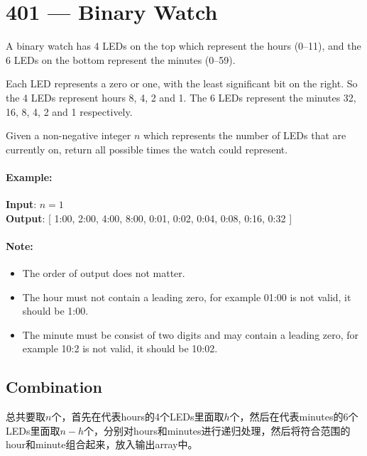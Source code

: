 \section{401 --- Binary Watch}
A binary watch has 4 LEDs on the top which represent the hours (0--11), and the 6 LEDs on the bottom represent the minutes (0--59).
\par
Each LED represents a zero or one, with the least significant bit on the right. So the 4 LEDs represent hours 8, 4, 2 and 1. The 6 LEDs represent the minutes 32, 16, 8, 4, 2 and 1 respectively.
\par
Given a non-negative integer $ n $ which represents the number of LEDs that are currently on, return all possible times the watch could represent.

\paragraph{Example:}

\begin{flushleft}
\textbf{Input}: $ n = 1 $
\\
\textbf{Output}: [ 1:00, 2:00, 4:00, 8:00, 0:01, 0:02, 0:04, 0:08, 0:16, 0:32 ]

\end{flushleft}

\paragraph{Note:}

\begin{itemize}
\item  The order of output does not matter.
\item The hour must not contain a leading zero, for example 01:00 is not valid, it should be 1:00.
\item The minute must be consist of two digits and may contain a leading zero, for example 10:2 is not valid, it should be 10:02.
\end{itemize}

\subsection{Combination}
总共要取$n$个，首先在代表hours的4个LEDs里面取$h$个，然后在代表minutes的6个LEDs里面取$n-h$个，分别对hours和minutes进行递归处理，然后将符合范围的hour和minute组合起来，放入输出array中。

